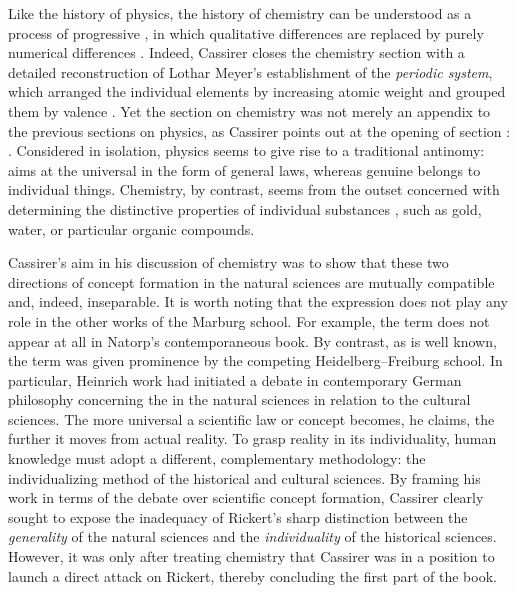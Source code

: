 \documentclass[submitted,12pt]{article}
\renewcommand{\SF}[2]{\citep[#1/#2]{Cassirer1910}}
\begin{document}
Like the history of physics, the history of chemistry can be understood as a process of progressive , in which qualitative differences are replaced by purely numerical differences \SF{289}{217}. Indeed, Cassirer closes the chemistry section with a detailed reconstruction of Lothar Meyer's establishment of the \emph{periodic system}, which arranged the individual elements by increasing atomic weight and grouped them by valence \SF{288--92}{216--220}. Yet the section on chemistry was not merely an appendix to the previous sections on physics, as Cassirer points out at the opening of section :  \SF{292}{220}. Considered in isolation, physics seems to give rise to a traditional antinomy:  aims at the universal in the form of general laws, whereas genuine  belongs to individual things. Chemistry, by contrast, seems from the outset concerned with determining the distinctive properties of individual substances , such as gold, water, or particular organic compounds. 


Cassirer’s aim in his discussion of chemistry was to show that these two directions of concept formation in the natural sciences are mutually compatible and, indeed, inseparable. It is worth noting that the expression   does not play any role in the other works of the Marburg school. For example, the term does not appear at all in Natorp's contemporaneous \citeyear{Natorp1910a} book. By contrast, as is well known, the term was given prominence by the competing Heidelberg--Freiburg school. In particular, Heinrich  work had initiated a debate in contemporary German philosophy concerning the  in the natural sciences in relation to the cultural sciences. The more universal a scientific law or concept becomes, he claims, the further it moves from actual reality. To grasp reality in its individuality, human knowledge must adopt a different, complementary methodology: the individualizing method of the historical and cultural sciences. By framing his work in terms of the debate over scientific concept formation, Cassirer clearly sought to expose the inadequacy of Rickert's sharp distinction between the \emph{generality} of the natural sciences and the \emph{individuality} of the historical sciences. However, it was only after treating chemistry that Cassirer was in a position to launch a direct attack on Rickert, thereby concluding the first part of the book.
\end{document}
